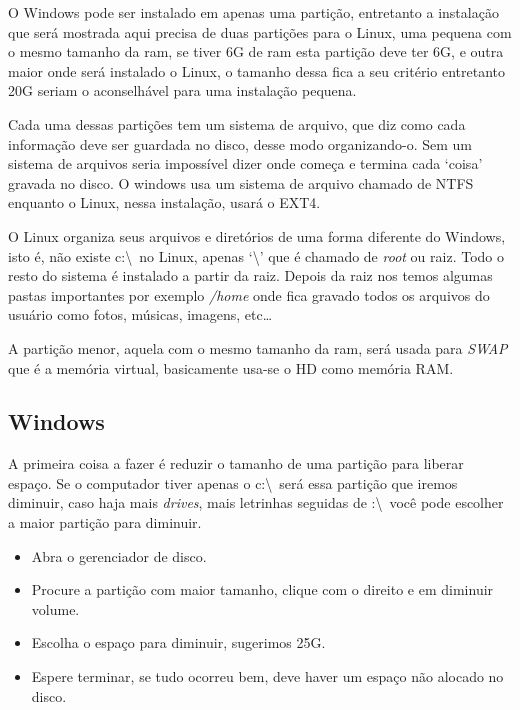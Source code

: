 \documentclass{handout_utfpr}
\begin{document}
O Windows pode ser instalado em apenas uma partição, entretanto a instalação que será mostrada aqui precisa de duas partições para o Linux, uma pequena com o mesmo tamanho da ram, se tiver 6G de ram esta partição deve ter 6G, e outra maior onde será instalado o Linux, o tamanho dessa fica a seu critério entretanto 20G seriam o aconselhável para uma instalação pequena.

Cada uma dessas partições tem um sistema de arquivo, que diz como cada informação deve ser guardada no disco, desse modo organizando-o. Sem um sistema de arquivos seria impossível dizer onde começa e termina cada `coisa' gravada no disco. O windows usa um sistema de arquivo chamado de NTFS enquanto o Linux, nessa instalação, usará o EXT4.

O Linux organiza seus arquivos e diretórios de uma forma diferente do Windows, isto é, não existe c:\textbackslash\ no Linux, apenas `\textbackslash' que é chamado de \emph{root} ou raiz. Todo o resto do sistema é instalado a partir da raiz. Depois da raiz nos temos algumas pastas importantes por exemplo \emph{/home} onde fica gravado todos os arquivos do usuário como fotos, músicas, imagens, etc\dots

A partição menor, aquela com o mesmo tamanho da ram, será usada para \emph{SWAP} que é a memória virtual, basicamente usa-se o HD como memória RAM.

\subsection{Windows}
A primeira coisa a fazer é reduzir o tamanho de uma partição para liberar espaço. Se o computador tiver apenas o c:\textbackslash\ será essa partição que iremos diminuir, caso haja mais \emph{drives}, mais letrinhas seguidas de :\textbackslash\ você pode escolher a maior partição para diminuir.

\begin{itemize}
    \item Abra o gerenciador de disco.
    \item Procure a partição com maior tamanho, clique com o direito e em diminuir volume.
    \item Escolha o espaço para diminuir, sugerimos 25G.
    \item Espere terminar, se tudo ocorreu bem, deve haver um espaço não alocado no disco.
\end{itemize}
\end{document}
